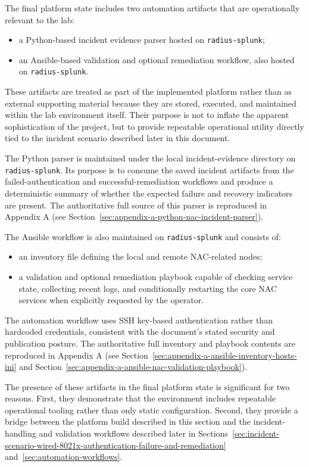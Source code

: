 \documentclass[11pt]{article}
\begin{document}
The final platform state includes two automation artifacts that are operationally relevant to the lab:

\begin{itemize}
    \item a Python-based incident evidence parser hosted on \texttt{radius-splunk};
    \item an Ansible-based validation and optional remediation workflow, also hosted on \texttt{radius-splunk}.
\end{itemize}

These artifacts are treated as part of the implemented platform rather than as external supporting material because they are stored, executed, and maintained within the lab environment itself. Their purpose is not to inflate the apparent sophistication of the project, but to provide repeatable operational utility directly tied to the incident scenario described later in this document.

The Python parser is maintained under the local incident-evidence directory on \texttt{radius-splunk}. Its purpose is to consume the saved incident artifacts from the failed-authentication and successful-remediation workflows and produce a deterministic summary of whether the expected failure and recovery indicators are present. The authoritative full source of this parser is reproduced in Appendix A (see Section~\ref{sec:appendix-a-python-nac-incident-parser}).

The Ansible workflow is also maintained on \texttt{radius-splunk} and consists of:

\begin{itemize}
    \item an inventory file defining the local and remote NAC-related nodes;
    \item a validation and optional remediation playbook capable of checking service state, collecting recent logs, and conditionally restarting the core NAC services when explicitly requested by the operator.
\end{itemize}

The automation workflow uses SSH key-based authentication rather than hardcoded credentials, consistent with the document's stated security and publication posture. The authoritative full inventory and playbook contents are reproduced in Appendix A (see Section~\ref{sec:appendix-a-ansible-inventory-hosts-ini} and Section~\ref{sec:appendix-a-ansible-nac-validation-playbook}).

The presence of these artifacts in the final platform state is significant for two reasons. First, they demonstrate that the environment includes repeatable operational tooling rather than only static configuration. Second, they provide a bridge between the platform build described in this section and the incident-handling and validation workflows described later in Sections~\ref{sec:incident-scenario-wired-8021x-authentication-failure-and-remediation} and~\ref{sec:automation-workflows}.
\end{document}
